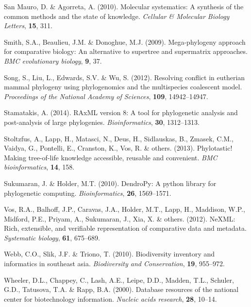 \documentclass[]{article}
\begin{document}
\leavevmode\hypertarget{ref-san2010molecular}{}%
San Mauro, D. \& Agorreta, A. (2010). Molecular systematics: A synthesis of the common methods and the state of knowledge. \emph{Cellular \& Molecular Biology Letters}, \textbf{15}, 311.

\leavevmode\hypertarget{ref-smith2009mega}{}%
Smith, S.A., Beaulieu, J.M. \& Donoghue, M.J. (2009). Mega-phylogeny approach for comparative biology: An alternative to supertree and supermatrix approaches. \emph{BMC evolutionary biology}, \textbf{9}, 37.

\leavevmode\hypertarget{ref-song2012resolving}{}%
Song, S., Liu, L., Edwards, S.V. \& Wu, S. (2012). Resolving conflict in eutherian mammal phylogeny using phylogenomics and the multispecies coalescent model. \emph{Proceedings of the National Academy of Sciences}, \textbf{109}, 14942--14947.

\leavevmode\hypertarget{ref-stamatakis2014raxml}{}%
Stamatakis, A. (2014). RAxML version 8: A tool for phylogenetic analysis and post-analysis of large phylogenies. \emph{Bioinformatics}, \textbf{30}, 1312--1313.

\leavevmode\hypertarget{ref-stoltzfus2013phylotastic}{}%
Stoltzfus, A., Lapp, H., Matasci, N., Deus, H., Sidlauskas, B., Zmasek, C.M., Vaidya, G., Pontelli, E., Cranston, K., Vos, R. \& others. (2013). Phylotastic! Making tree-of-life knowledge accessible, reusable and convenient. \emph{BMC bioinformatics}, \textbf{14}, 158.

\leavevmode\hypertarget{ref-sukumaran2010dendropy}{}%
Sukumaran, J. \& Holder, M.T. (2010). DendroPy: A python library for phylogenetic computing. \emph{Bioinformatics}, \textbf{26}, 1569--1571.

\leavevmode\hypertarget{ref-vos2012nexml}{}%
Vos, R.A., Balhoff, J.P., Caravas, J.A., Holder, M.T., Lapp, H., Maddison, W.P., Midford, P.E., Priyam, A., Sukumaran, J., Xia, X. \& others. (2012). NeXML: Rich, extensible, and verifiable representation of comparative data and metadata. \emph{Systematic biology}, \textbf{61}, 675--689.

\leavevmode\hypertarget{ref-webb2010biodiversity}{}%
Webb, C.O., Slik, J.F. \& Triono, T. (2010). Biodiversity inventory and informatics in southeast asia. \emph{Biodiversity and Conservation}, \textbf{19}, 955--972.

\leavevmode\hypertarget{ref-wheeler2000database}{}%
Wheeler, D.L., Chappey, C., Lash, A.E., Leipe, D.D., Madden, T.L., Schuler, G.D., Tatusova, T.A. \& Rapp, B.A. (2000). Database resources of the national center for biotechnology information. \emph{Nucleic acids research}, \textbf{28}, 10--14.
\end{document}
